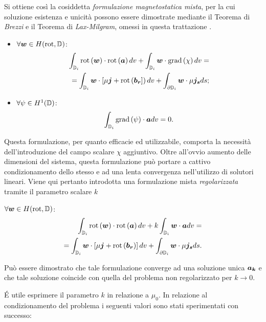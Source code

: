  Si ottiene così la cosiddetta \textit{formulazione magnetostatica mista}, per la cui soluzione esistenza e unicità possono essere dimostrate mediante il Teorema di \textit{Brezzi} e il Teorema di \textit{Lax-Milgram}, omessi in questa trattazione \citep{zaglmayr_high_2006}.
 
\begin{itemize}
\item $\forall \boldsymbol{w} \in H(\text{rot},\mathbb{D})$:
\begin{align}
\label{eq:3weak3_a}
\int_{\mathbb{D}_i}\text{rot}\left(\boldsymbol{w}\right)\cdot \text{rot}\left(\boldsymbol{a}\right) dv +\int_{\mathbb{D}_i} \boldsymbol{w} \cdot \text{grad} \left(\chi\right) dv
= \nonumber\\
=\int_{\mathbb{D}_i}\boldsymbol{w}\cdot\left[\mu\boldsymbol{j}+\text{rot}\left(\boldsymbol{b_r}\right]\right)dv+\int_{\partial\mathbb{D}_i}\boldsymbol{w}\cdot \mu\boldsymbol{j_s} ds;
\end{align}
\item $\forall \psi \in H^1(\mathbb{D})$:
\begin{align}
\label{eq:3weak3_b}
\int_{\mathbb{D}_i}\text{grad} \left(\psi\right) \cdot \boldsymbol{a}  dv = 0.
\end{align}
\end{itemize}

Questa formulazione, per quanto efficacie ed utilizzabile, comporta la necessità dell'introduzione del campo scalare $\chi$ aggiuntivo. Oltre all'ovvio aumento delle dimensioni del sistema, questa formulazione può portare a cattivo condizionamento dello stesso e ad una lenta convergenza nell'utilizzo di solutori lineari. Viene qui  pertanto introdotta una formulazione mista \textit{regolarizzata} tramite il parametro scalare $k$

$\forall \boldsymbol{w} \in H(\text{rot},\mathbb{D})$: 
\begin{align}
\label{eq:3weak5}
\int_{\mathbb{D}_i}\text{rot}\left(\boldsymbol{w}\right)\cdot \text{rot}\left(\boldsymbol{a}\right) dv +k\int_{\mathbb{D}_i} \boldsymbol{w} \cdot \boldsymbol{a} dv
= \nonumber\\
=\int_{\mathbb{D}_i}\boldsymbol{w}\cdot\left[\mu\boldsymbol{j}+\text{rot}\left(\boldsymbol{b_r}\right)\right]dv+\int_{\partial\mathbb{D}_i}\boldsymbol{w}\cdot \mu\boldsymbol{j_s} ds.
\end{align}

Può essere dimostrato che tale formulazione converge ad una soluzione unica $\boldsymbol{a_k}$ e che tale soluzione coincide con quella del problema non regolarizzato per $k\rightarrow 0$. 

\'E utile esprimere il parametro $k$ in relazione a $\mu_0$. In relazione al condizionamento del problema i seguenti valori sono stati sperimentati con successo: 

